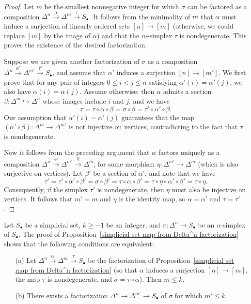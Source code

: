 \begin{proof}
Let $m$ be the smallest nonnegative integer for which $\sigma$ can be factored as a composition $\Delta^n\stackrel{\alpha}{\to}\Delta^m\stackrel{\tau}{\to}S_\bullet$. It follows from the minimality of $m$ that $\alpha$ must induce a surjection of linearly ordered sets $[n]\to[m]$ (otherwise, we could replace $[m]$ by the image of $\alpha$) and that the $m$-simplex $\tau$ is nondegenerate. This proves the existence of the desired factorization.\par
Suppose we are given another factorization of $\sigma$ as a
composition $\Delta^n\stackrel{\alpha'}{\to}\Delta^{m'}\stackrel{\tau'}{\to}S_\bullet$, and assume that $\alpha'$ induces a surjection $[n]\to[m']$. We first prove that for any pair of integers $0\leq i<j\leq n$ satisfying $\alpha'(i)=\alpha'(j)$, we also have $\alpha(i)=\alpha(j)$. Assume otherwise; then $\alpha$ admits a section $\beta:\Delta^m\hookrightarrow\Delta^n$ whose images include $i$ and $j$, and we have
\[\tau=\tau\circ\alpha\circ\beta=\sigma\circ\beta=\tau'\circ\alpha'\circ\beta.\]
Our assumption that $\alpha'(i)=\alpha'(j)$ guarantees that the map $(\alpha'\circ\beta):\Delta^m\to\Delta^{m'}$ is not injective on vertices, contradicting to the fact that $\tau$ is nondegenerate.\par
Now it follows from the preceding argument that $\alpha$ factors uniquely as a composition $\Delta^n\stackrel{\alpha'}{\to}\Delta^{m'}\stackrel{\eta}{\to}\Delta^m$, for some morphism $\eta:\Delta^{m'}\to\Delta^m$ (which is also surjective on vertices). Let $\beta'$ be a section of $\alpha'$, and note that we have
\[\tau'=\tau'\circ\alpha'\circ\beta'=\sigma\circ\beta'=\tau\circ\alpha\circ\beta'=\tau\circ\eta\circ\alpha'\circ\beta'=\tau\circ\eta.\]
Consequently, if the simplex $\tau'$ is nondegenerate, then $\eta$ must also be injective on vertices. It follows that $m'=m$ and $\eta$ is the identity map, so $\alpha=\alpha'$ and $\tau=\tau'$.
\end{proof}
Let $S_\bullet$ be a simplicial set, $k\geq-1$ be an integer, and $\sigma:\Delta^n\to S_\bullet$ be an $n$-simplex of $S_\bullet$. The proof of Proposition~\ref{simplicial set map from Delta^n factorization} shows that the following conditions are equivalent:
\begin{itemize}
\item[(a)] Let $\Delta^n\stackrel{\alpha}{\to}\Delta^m\stackrel{\tau}{\to}S_\bullet$ be the factorization of Proposition~\ref{simplicial set map from Delta^n factorization} (so that $\alpha$ induces a surjection $[n]\to[m]$, the map $\tau$ is nondegenerate, and $\sigma=\tau\circ\alpha$). Then $m\leq k$.
\item[(b)] There exists a factorization $\Delta^n\to\Delta^{m'}\to S_\bullet$ of $\sigma$ for which $m'\leq k$.
\end{itemize}
